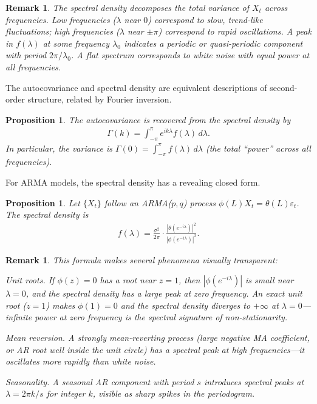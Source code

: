 \documentclass{report}
\theoremstyle{spacedplain}
\newtheorem{proposition}[theorem]{Proposition}
\theoremstyle{spaceddefinition}
\theoremstyle{spacedremark}
\newtheorem{remark}[theorem]{Remark}
\begin{document}
\begin{remark}
The spectral density decomposes the total variance of $X_t$ across frequencies. Low frequencies ($\lambda$ near $0$) correspond to slow, trend-like fluctuations; high frequencies ($\lambda$ near $\pm\pi$) correspond to rapid oscillations. A peak in $f(\lambda)$ at some frequency $\lambda_0$ indicates a periodic or quasi-periodic component with period $2\pi/\lambda_0$. A flat spectrum corresponds to white noise with equal power at all frequencies.
\end{remark}

The autocovariance and spectral density are equivalent descriptions of second-order structure, related by Fourier inversion.

\begin{proposition}
The autocovariance is recovered from the spectral density by
\begin{align}
    \Gamma(k) = \int_{-\pi}^{\pi} e^{ik\lambda} f(\lambda)\, d\lambda.
\end{align}
In particular, the variance is $\Gamma(0) = \int_{-\pi}^{\pi} f(\lambda)\, d\lambda$ (the total ``power'' across all frequencies).
\end{proposition}

For ARMA models, the spectral density has a revealing closed form.

\begin{proposition}
Let $\{X_t\}$ follow an ARMA($p,q$) process $\phi(L)X_t = \theta(L)\varepsilon_t$. The spectral density is
\begin{align}
    f(\lambda) = \frac{\sigma^2}{2\pi} \cdot \frac{|\theta(e^{-i\lambda})|^2}{|\phi(e^{-i\lambda})|^2}.
\end{align}
\end{proposition}

\begin{remark}
This formula makes several phenomena visually transparent:

\emph{Unit roots.} If $\phi(z) = 0$ has a root near $z = 1$, then $|\phi(e^{-i\lambda})|$ is small near $\lambda = 0$, and the spectral density has a large peak at zero frequency. An exact unit root ($z = 1$) makes $\phi(1) = 0$ and the spectral density diverges to $+\infty$ at $\lambda = 0$---infinite power at zero frequency is the spectral signature of non-stationarity.

\emph{Mean reversion.} A strongly mean-reverting process (large negative MA coefficient, or AR root well inside the unit circle) has a spectral peak at high frequencies---it oscillates more rapidly than white noise.

\emph{Seasonality.} A seasonal AR component with period $s$ introduces spectral peaks at $\lambda = 2\pi k/s$ for integer $k$, visible as sharp spikes in the periodogram.
\end{remark}
\end{document}
